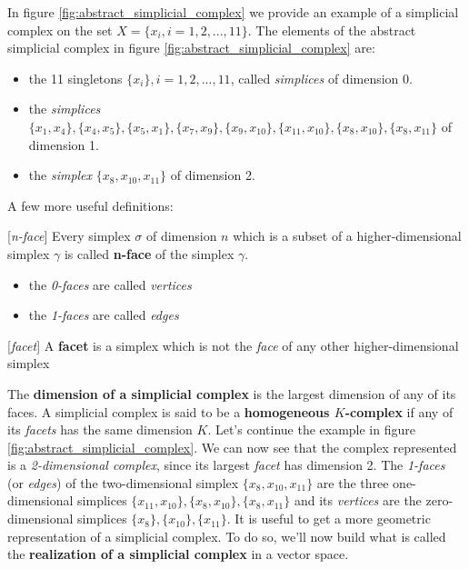 In figure \ref{fig:abstract_simplicial_complex} we provide an example of a simplicial complex on the set $X=\{x_i, i=1,2, ...,11\}$. The elements of the abstract simplicial complex in figure \ref{fig:abstract_simplicial_complex} are: 
\begin{itemize}
	\item the 11 singletons $\{x_i\}, i=1,2, ..., 11$, called \textit{simplices} of dimension 0.
	\item the \textit{simplices} $\{x_1, x_4\}, \{x_4, x_5\}, \{x_5, x_1\}, \{x_7, x_9\}, \{x_9, x_{10}\}, \{x_{11}, x_{10}\}, \{x_8, x_{10}\}, \{x_8, x_{11}\}$  of dimension 1.
	\item the \textit{simplex} $\{x_8, x_{10}, x_{11}\}$ of dimension 2.
\end{itemize}

A few more useful definitions:
\begin{definition}{[\textit{n-face}]}
	Every simplex $\sigma$ of dimension $n$ which is a subset of a higher-dimensional simplex $\gamma$ is called \textbf{n-face} of the simplex $\gamma$.
	\begin{itemize}
		\item the \textit{0-faces} are called \textit{vertices}
		\item the \textit{1-faces} are called \textit{edges}
	\end{itemize}
\end{definition}
\begin{definition}{[\textit{facet}]}
	A \textbf{facet} is a simplex which is not the \textit{face} of any other higher-dimensional simplex
\end{definition}
The \textbf{dimension of a simplicial complex} is the largest dimension of any of its faces. A simplicial complex is said to be a \textbf{homogeneous $K$-complex} if any of its \textit{facets} has the same dimension $K$.
Let's continue the example in figure \ref{fig:abstract_simplicial_complex}. We can now see that the complex represented is a \textit{2-dimensional complex}, since its largest \textit{facet} has dimension 2. The \textit{1-faces} (or \textit{edges}) of the two-dimensional simplex $\{x_8, x_{10}, x_{11}\}$ are the three one-dimensional simplices $\{x_{11}, x_{10}\}, \{x_8, x_{10}\}, \{x_8, x_{11}\}$ and its \textit{vertices} are the zero-dimensional simplices $\{x_8\}, \{x_{10}\}, \{x_{11}\}$.\newline
It is useful to get a more geometric representation of a simplicial complex. To do so, we'll now build what is called the \textbf{realization of a simplicial complex} in a vector space.

